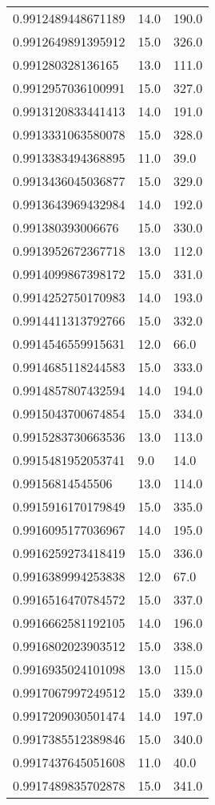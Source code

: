\begin{center}
\begin{supertabular}[H]{p{0.30\textwidth}p{0.05\textwidth}p{0.05\textwidth}}
0.9912489448671189 & 14.0 & 190.0 \\ 
0.9912649891395912 & 15.0 & 326.0 \\ 
0.991280328136165 & 13.0 & 111.0 \\ 
0.9912957036100991 & 15.0 & 327.0 \\ 
0.9913120833441413 & 14.0 & 191.0 \\ 
0.9913331063580078 & 15.0 & 328.0 \\ 
0.9913383494368895 & 11.0 & 39.0 \\ 
0.9913436045036877 & 15.0 & 329.0 \\ 
0.9913643969432984 & 14.0 & 192.0 \\ 
0.991380393006676 & 15.0 & 330.0 \\ 
0.9913952672367718 & 13.0 & 112.0 \\ 
0.9914099867398172 & 15.0 & 331.0 \\ 
0.9914252750170983 & 14.0 & 193.0 \\ 
0.9914411313792766 & 15.0 & 332.0 \\ 
0.9914546559915631 & 12.0 & 66.0 \\ 
0.9914685118244583 & 15.0 & 333.0 \\ 
0.9914857807432594 & 14.0 & 194.0 \\ 
0.9915043700674854 & 15.0 & 334.0 \\ 
0.9915283730663536 & 13.0 & 113.0 \\ 
0.9915481952053741 & 9.0 & 14.0 \\ 
0.99156814545506 & 13.0 & 114.0 \\ 
0.9915916170179849 & 15.0 & 335.0 \\ 
0.9916095177036967 & 14.0 & 195.0 \\ 
0.9916259273418419 & 15.0 & 336.0 \\ 
0.9916389994253838 & 12.0 & 67.0 \\ 
0.9916516470784572 & 15.0 & 337.0 \\ 
0.9916662581192105 & 14.0 & 196.0 \\ 
0.9916802023903512 & 15.0 & 338.0 \\ 
0.9916935024101098 & 13.0 & 115.0 \\ 
0.9917067997249512 & 15.0 & 339.0 \\ 
0.9917209030501474 & 14.0 & 197.0 \\ 
0.9917385512389846 & 15.0 & 340.0 \\ 
0.9917437645051608 & 11.0 & 40.0 \\ 
0.9917489835702878 & 15.0 & 341.0 \\ 

\end{supertabular}
\end{center}
